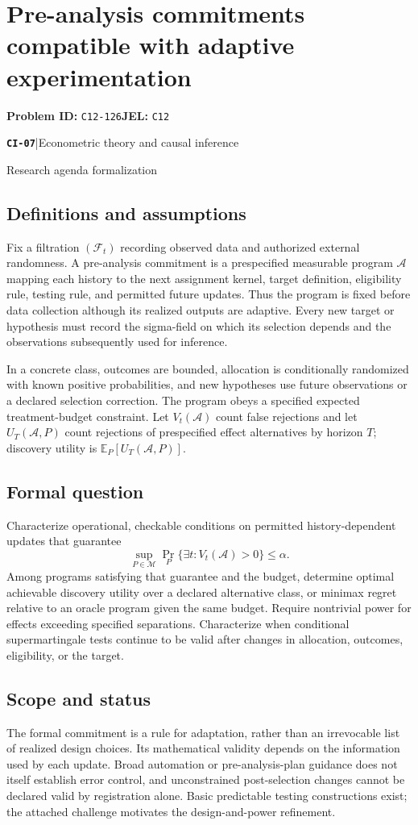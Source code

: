 \documentclass[11pt,a4paper]{article}
\newcommand{\E}{\mathbb E}
\newcommand{\entrymeta}[3]{{\sffamily\small\color{muted}\textbf{\texttt{#1}}\quad|\quad #2\par #3\par}}
\begin{document}
\section*{Pre-analysis commitments compatible with adaptive experimentation}
\textbf{Problem ID:} \texttt{C12-126}\quad \textbf{JEL:} \texttt{C12}\par
\label{problem:OP-0486}
\label{beyond:CI-07}
\entrymeta{CI-07}{Econometric theory and causal inference}{Research agenda formalization}
\subsection*{Definitions and assumptions}
Fix a filtration $(\mathcal F_t)$ recording observed data and authorized external randomness. A pre-analysis commitment is a prespecified measurable program $\mathcal A$ mapping each history to the next assignment kernel, target definition, eligibility rule, testing rule, and permitted future updates. Thus the program is fixed before data collection although its realized outputs are adaptive. Every new target or hypothesis must record the sigma-field on which its selection depends and the observations subsequently used for inference.

In a concrete class, outcomes are bounded, allocation is conditionally randomized with known positive probabilities, and new hypotheses use future observations or a declared selection correction. The program obeys a specified expected treatment-budget constraint. Let $V_t(\mathcal A)$ count false rejections and let $U_T(\mathcal A,P)$ count rejections of prespecified effect alternatives by horizon $T$; discovery utility is $\E_P[U_T(\mathcal A,P)]$.
\subsection*{Formal question}
Characterize operational, checkable conditions on permitted history-dependent updates that guarantee
\[
\sup_{P\in\mathcal M}\Pr_P\{\exists t:V_t(\mathcal A)>0\}
\leq\alpha.
\]
Among programs satisfying that guarantee and the budget, determine optimal achievable discovery utility over a declared alternative class, or minimax regret relative to an oracle program given the same budget. Require nontrivial power for effects exceeding specified separations. Characterize when conditional supermartingale tests continue to be valid after changes in allocation, outcomes, eligibility, or the target.
\subsection*{Scope and status}
The formal commitment is a rule for adaptation, rather than an irrevocable list of realized design choices. Its mathematical validity depends on the information used by each update. Broad automation or pre-analysis-plan guidance does not itself establish error control, and unconstrained post-selection changes cannot be declared valid by registration alone. Basic predictable testing constructions exist; the attached challenge motivates the design-and-power refinement.
\end{document}
